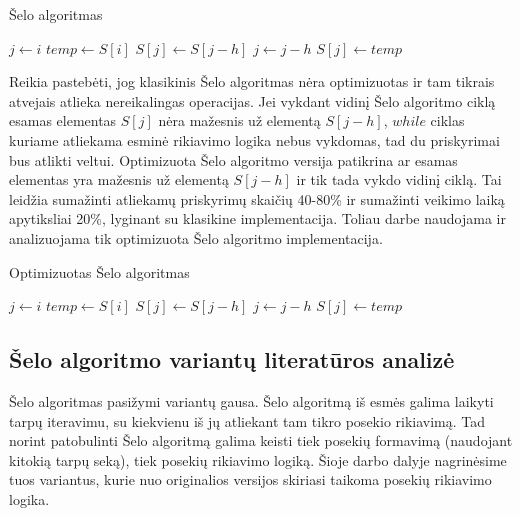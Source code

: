 \documentclass{VUMIFInfBakalaurinis}
\begin{document}
\begin{algorithm}[H]
  \caption{Šelo algoritmas}\label{alg:shellsort}
  \begin{algorithmic}[1]
      \State $j\gets i$
      \State $temp\gets S[i]$
        \State $S[j]\gets S[j - h]$
        \State $j\gets j-h$
      \EndWhile
      \State $S[j]\gets temp$
    \EndFor
  \EndFor
  \end{algorithmic}
\end{algorithm}

Reikia pastebėti, jog klasikinis Šelo algoritmas nėra optimizuotas ir tam tikrais atvejais atlieka nereikalingas operacijas.
Jei vykdant vidinį Šelo algoritmo ciklą esamas elementas $S[j]$ nėra mažesnis už elementą $S[j-h]$,
$while$ ciklas kuriame atliekama esminė rikiavimo logika nebus vykdomas, tad du priskyrimai bus atlikti veltui.
Optimizuota Šelo algoritmo versija \cite{Radavičius_Baranauskas_2013} patikrina ar esamas elementas yra mažesnis už elementą $S[j-h]$ ir tik tada vykdo vidinį ciklą.
Tai leidžia sumažinti atliekamų priskyrimų skaičių 40-80\% ir sumažinti veikimo laiką apytiksliai 20\%, lyginant su klasikine implementacija.
Toliau darbe naudojama ir analizuojama tik optimizuota Šelo algoritmo implementacija. 

\begin{algorithm}[H]
    \caption{Optimizuotas Šelo algoritmas}\label{alg:shellsort_optimized}
    \begin{algorithmic}[1]
            \State $j\gets i$
            \State $temp\gets S[i]$
            \Repeat
              \State $S[j]\gets S[j - h]$
              \State $j\gets j-h$
            \State $S[j]\gets temp$
          \EndIf
        \EndFor
      \EndFor
    \end{algorithmic}
  \end{algorithm}

\subsection{Šelo algoritmo variantų literatūros analizė}

Šelo algoritmas pasižymi variantų gausa.
Šelo algoritmą iš esmės galima laikyti tarpų iteravimu, su kiekvienu iš jų atliekant tam tikro posekio rikiavimą.
Tad norint patobulinti Šelo algoritmą galima keisti tiek posekių formavimą (naudojant kitokią tarpų seką),
tiek posekių rikiavimo logiką.
Šioje darbo dalyje nagrinėsime tuos variantus, kurie nuo originalios versijos skiriasi taikoma posekių rikiavimo logika.
\end{document}
